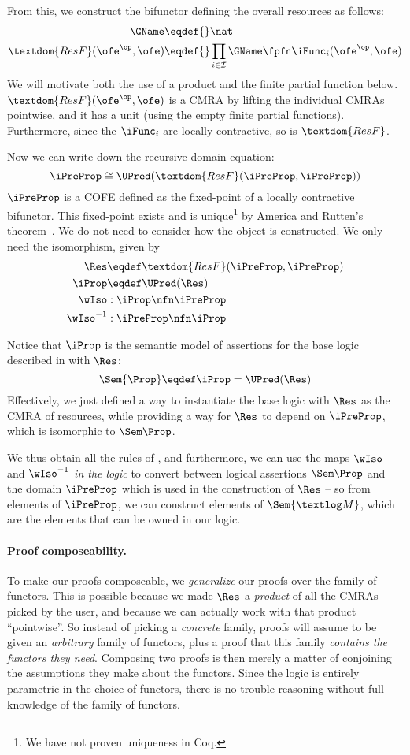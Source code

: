 From this, we construct the bifunctor defining the overall resources as follows:
\begin{align*}
  \GName \eqdef{}& \nat \\
  \textdom{ResF}(\ofe^\op, \ofe) \eqdef{}& \prod_{i \in \mathcal I} \GName \fpfn \iFunc_i(\ofe^\op, \ofe)
\end{align*}
We will motivate both the use of a product and the finite partial function below.
$\textdom{ResF}(\ofe^\op, \ofe)$ is a CMRA by lifting the individual CMRAs pointwise, and it has a unit (using the empty finite partial functions).
Furthermore, since the $\iFunc_i$ are locally contractive, so is $\textdom{ResF}$.

Now we can write down the recursive domain equation:
\[ \iPreProp \cong \UPred(\textdom{ResF}(\iPreProp, \iPreProp)) \]
$\iPreProp$ is a COFE defined as the fixed-point of a locally contractive bifunctor.
This fixed-point exists and is unique\footnote{We have not proven uniqueness in Coq.} by America and Rutten's theorem~\cite{America-Rutten:JCSS89,birkedal:metric-space}.
We do not need to consider how the object is constructed. 
We only need the isomorphism, given by
\begin{align*}
  \Res &\eqdef \textdom{ResF}(\iPreProp, \iPreProp) \\
  \iProp &\eqdef \UPred(\Res) \\
	\wIso &: \iProp \nfn \iPreProp \\
	\wIso^{-1} &: \iPreProp \nfn \iProp
\end{align*}

Notice that $\iProp$ is the semantic model of assertions for the base logic described in  with $\Res$:
\[ \Sem{\Prop} \eqdef \iProp = \UPred(\Res) \]
Effectively, we just defined a way to instantiate the base logic with $\Res$ as the CMRA of resources, while providing a way for $\Res$ to depend on $\iPreProp$, which is isomorphic to $\Sem\Prop$.

We thus obtain all the rules of , and furthermore, we can use the maps $\wIso$ and $\wIso^{-1}$ \emph{in the logic} to convert between logical assertions $\Sem\Prop$ and the domain $\iPreProp$ which is used in the construction of $\Res$ -- so from elements of $\iPreProp$, we can construct elements of $\Sem{\textlog M}$, which are the elements that can be owned in our logic.

\paragraph{Proof composeability.}
To make our proofs composeable, we \emph{generalize} our proofs over the family of functors.
This is possible because we made $\Res$ a \emph{product} of all the CMRAs picked by the user, and because we can actually work with that product ``pointwise''.
So instead of picking a \emph{concrete} family, proofs will assume to be given an \emph{arbitrary} family of functors, plus a proof that this family \emph{contains the functors they need}.
Composing two proofs is then merely a matter of conjoining the assumptions they make about the functors.
Since the logic is entirely parametric in the choice of functors, there is no trouble reasoning without full knowledge of the family of functors.

